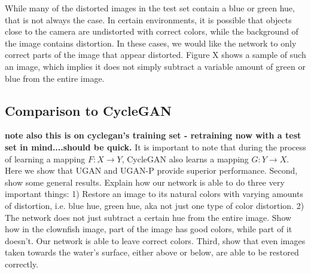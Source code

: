 \documentclass[conference,reqno]{IEEEtran}
\begin{document}
While many of the distorted images in the test set contain a blue or green hue, that is not always the case. In certain
environments, it is possible that objects close to the camera are undistorted with correct colors, while the background
of the image contains distortion. In these cases, we would like the network to only correct parts of the image that
appear distorted. Figure X shows a sample of such an image, which implies it does not simply subtract a variable
amount of green or blue from the entire image.


\subsection{Comparison to CycleGAN}
\textbf{note also this is on cyclegan's training set - retraining now with a test set in mind....should be quick.}
It is important to note that during the process of learning a mapping $F: X \rightarrow Y$, CycleGAN also learns a
mapping $G: Y \rightarrow X$. Here we show that UGAN and UGAN-P provide superior performance.
Second, show some general results. Explain how our network is able to do three very important things: 1) Restore an
image to its natural colors with varying amounts of distortion, i.e. blue hue, green hue, aka not just one type of
color distortion. 2) The network does not just subtract a certain hue from the entire image. Show how in the clownfish
image, part of the image has good colors, while part of it doesn't. Our network is able to leave correct colors. Third,
show that even images taken towards the water's surface, either above or below, are able to be restored correctly.
\end{document}
